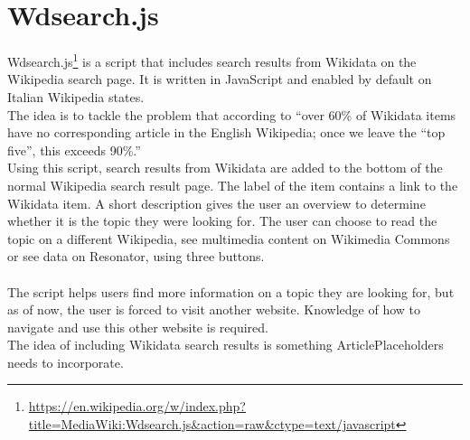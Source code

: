 \section{Wdsearch.js}
Wdsearch.js\footnote{\url{https://en.wikipedia.org/w/index.php?title=MediaWiki:Wdsearch.js&action=raw&ctype=text/javascript}} is a script that includes search results from Wikidata on the Wikipedia search page. It is written in JavaScript and enabled by default on Italian Wikipedia \citet{gerardm:01} states. \\
The idea is to tackle the problem that according to \citet{manske:01} ``over 60\% of Wikidata items have no corresponding article in the English Wikipedia; once we leave the ``top five'', this exceeds 90\%.'' \\
Using this script, search results from Wikidata are added to the bottom of the normal Wikipedia search result page. The label of the item contains a link to the Wikidata item. A short description gives the user an overview to determine whether it is the topic they were looking for. The user can choose to read the topic on a different Wikipedia, see multimedia content on Wikimedia Commons or see data on Resonator, using three buttons. \\
\\
The script helps users find more information on a topic they are looking for, but as of now, the user is forced to visit another website. Knowledge of how to navigate and use this other website is required. \\
The idea of including Wikidata search results is something ArticlePlaceholders needs to incorporate.